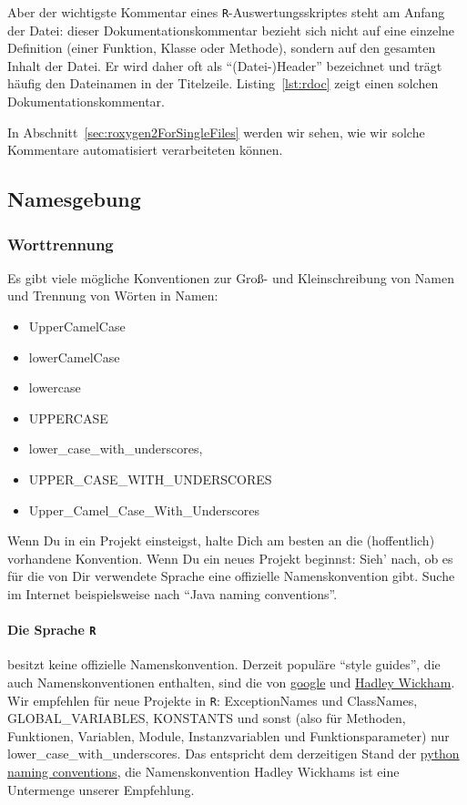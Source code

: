 \documentclass[twoside]{scrartcl}
\providecommand{\R}{\texttt{R}}
\begin{document}
Aber der wichtigste Kommentar eines \R{}-Auswertungsskriptes steht  
am Anfang der Datei: dieser Dokumentationskommentar bezieht sich nicht auf eine
einzelne Definition (einer Funktion, Klasse oder Methode), sondern auf den 
gesamten Inhalt der
Datei. Er wird daher oft als "`(Datei-)Header"' bezeichnet und tr\"a{}gt
h\"a{}ufig den Dateinamen in der Titelzeile.
Listing~\ref{lst:rdoc} zeigt einen solchen Dokumentationskommentar. 

 
In Abschnitt~\ref{sec:roxygen2ForSingleFiles} werden wir sehen, wie wir solche
Kommentare automatisiert verarbeiteten k\"o{}nnen.


\subsection{Namesgebung\label{sec:naming}}
\subsubsection{Worttrennung}
Es gibt viele m\"o{}gliche Konventionen zur Gro\ss{}- und Kleinschreibung  von
Namen und
Trennung von W\"o{}rten in Namen:
\begin{itemize}
\item UpperCamelCase
\item lowerCamelCase
\item lowercase
\item UPPERCASE
\item lower\_case\_with\_underscores,
\item UPPER\_CASE\_WITH\_UNDERSCORES
\item Upper\_Camel\_Case\_With\_Underscores
\end{itemize}
Wenn Du in ein Projekt einsteigst, halte Dich am besten an die (hoffentlich)
vorhandene Konvention.
Wenn Du ein neues Projekt beginnst: Sieh' nach, ob es f\"u{}r die von Dir 
verwendete Sprache eine offizielle Namenskonvention gibt. Suche im Internet 
beispielsweise nach "`Java naming conventions"'.

\paragraph{Die Sprache \R{}} besitzt keine offizielle
Namenskonvention. Derzeit
popul\"a{}re "`style guides"', die auch Namenskonventionen enthalten, sind die
von
\href{https://google-styleguide.googlecode.com/svn/trunk/Rguide.xml}{google} und
\href{http://adv-r.had.co.nz/Style.html}{Hadley Wickham}.
Wir empfehlen f\"u{}r neue Projekte in \R{}: 
ExceptionNames und ClassNames, GLOBAL\_VARIABLES, KONSTANTS und sonst (also
f\"u{}r Methoden, Funktionen, Variablen, Module, Instanzvariablen und
Funktionsparameter) nur 
lower\_case\_with\_underscores.
Das entspricht dem derzeitigen Stand der
\href{http://legacy.python.org/dev/peps/pep-0008/#naming-conventions}{python
  naming conventions}, die Namenskonvention Hadley Wickhams ist eine
  Untermenge unserer Empfehlung.
\end{document}
